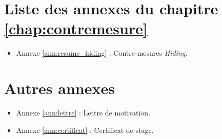 \documentclass[oneside]{book}
\begin{document}
\begin{appendices}
\newpage

\chapter{Liste des annexes du chapitre \ref{chap:contremesure}}
\begin{itemize}
\item Annexe \ref{ann:resume_hiding} : Contre-mesures \textit{Hiding}.
\end{itemize}

\newpage




\newpage

\chapter{Autres annexes}
\begin{itemize}
\item Annexe \ref{ann:lettre} : Lettre de motivation.
\item Annexe \ref{ann:certificat} : Certificat de stage.
\end{itemize}



\newpage




\end{appendices}
\end{document}
